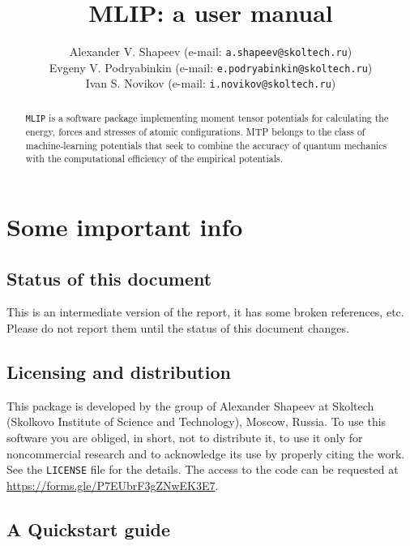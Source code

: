 \documentclass[12pt]{article}
\author{Alexander V. Shapeev (e-mail: \texttt{a.shapeev@skoltech.ru})
\\
Evgeny V. Podryabinkin (e-mail: \texttt{e.podryabinkin@skoltech.ru})
\\
Ivan S. Novikov (e-mail: \texttt{i.novikov@skoltech.ru})
}
\title{MLIP: a user %
manual}
\renewcommand{\_}{\char`_}
\begin{document}
\sloppy

\maketitle

\begin{abstract}
	\texttt{MLIP} is a software package implementing moment tensor potentials for calculating the energy, forces and stresses of atomic configurations.
	MTP belongs to the class of machine-learning potentials that seek to combine the accuracy of quantum mechanics with the computational efficiency of the empirical potentials.
\end{abstract}


\tableofcontents


\section{Some important info}
\subsection{Status of this document}	
This is an intermediate version of the report, it has some broken references, etc.
Please do not report them until the status of this document changes.

\subsection{Licensing and distribution}	
This package is developed by the group of Alexander Shapeev at Skoltech (Skolkovo Institute of Science and Technology), Moscow, Russia.
To use this software you are obliged, in short, not to distribute it, to use it only for noncommercial research and to acknowledge its use by properly citing the work.
See the \texttt{LICENSE} file for the details.
The access to the code can be requested at \url{https://forms.gle/P7EUbrF3gZNwEK3E7}.

\subsection{A Quickstart guide}
\end{document}
